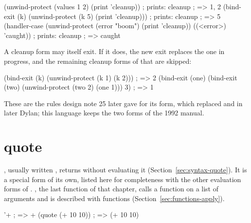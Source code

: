 \begin{dylan}
(unwind-protect (values 1 2)
  (print 'cleanup))      ; prints: cleanup
                         ; => 1, 2
(bind-exit (k)
  (unwind-protect (k 5)
    (print 'cleanup)))   ; prints: cleanup
                         ; => 5
(handler-case
    (unwind-protect (error "boom")
      (print 'cleanup))
  ((<error>) 'caught))   ; prints: cleanup
                         ; => caught
\end{dylan}

\noindent A cleanup form may itself exit. If it does, the new exit replaces
the one in progress, and the remaining cleanup forms of that
 are skipped:

\begin{dylan}
(bind-exit (k)
  (unwind-protect (k 1)
    (k 2)))              ; => 2
(bind-exit (one)
  (bind-exit (two)
    (unwind-protect (two 2)
      (one 1)))
  3)                     ; => 1
\end{dylan}

\noindent These are the rules design note 25 later gave for its
 form, which replaced  and
 in later Dylan; this language keeps the two forms of
the 1992 manual.

\section{quote}

, usually written , returns
 without evaluating it (Section~\ref{sec:syntax-quote}). It is a
special form of its own, listed here for completeness with the other
evaluation forms of . , the last function
of that chapter, calls a function on a list of arguments and is described
with functions (Section~\ref{sec:functions-apply}).

\begin{dylan}
'+                       ; => +
(quote (+ 10 10))        ; => (+ 10 10)
\end{dylan}
